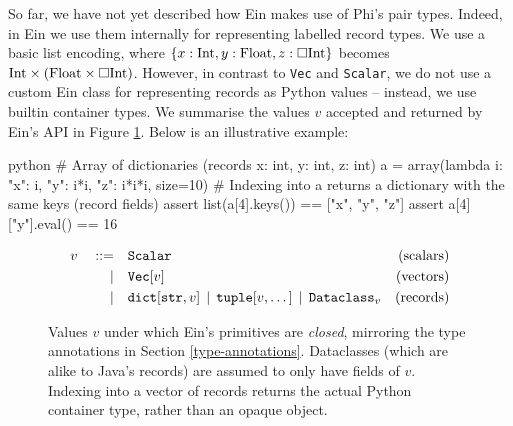So far, we have not yet described how Ein makes use of Phi's pair types. Indeed, in Ein we use them internally for representing labelled record types. We use a basic list encoding, where $\{ x: \mathrm{Int}, y: \mathrm{Float}, z: \Box{\mathrm{Int}} \}$ becomes $\phipairtype{\phiinttype}{\left( \phifloattype \times \phivectype{\phiinttype} \right)}$. However, in contrast to \texttt{Vec} and \texttt{Scalar}, we do not use a custom Ein class for representing records as Python values -- instead, we use builtin container types. We summarise the values $v$ accepted and returned by Ein's API in Figure \ref{fig:ein-values}.
Below is an illustrative example:
\begin{center} 
\begin{cminted}{python}
# Array of dictionaries (records {x: int, y: int, z: int})
a = array(lambda i: {"x": i, "y": i*i, "z": i*i*i}, size=10)
# Indexing into a returns a dictionary with the same keys (record fields)
assert list(a[4].keys()) == ["x", "y", "z"]
assert a[4]["y"].eval() == 16
\end{cminted}
\end{center}

\begin{figure}
    \centering
    \begin{align*}
    v \quad::=&\quad 
    \text{\texttt{Scalar}}
    & \text{(scalars)} \\
    \mid&\quad
    \text{\texttt{Vec}}[v]
    & \text{(vectors)} \\
    \mid&\quad
    \text{\texttt{dict}}[\text{\texttt{str}}, v] 
    \,\mid\, \text{\texttt{tuple}}[v, \dots] 
    \,\mid\, \texttt{Dataclass}_v
    & \text{(records)}
    \end{align*}
    \caption{Values $v$ under which Ein's primitives are \textit{closed}, mirroring the type annotations in Section \ref{type-annotations}. Dataclasses (which are alike to Java's records) are assumed to only have fields of $v$. Indexing into a vector of records returns the actual Python container type, rather than an opaque object.}
    \label{fig:ein-values}
\end{figure}


